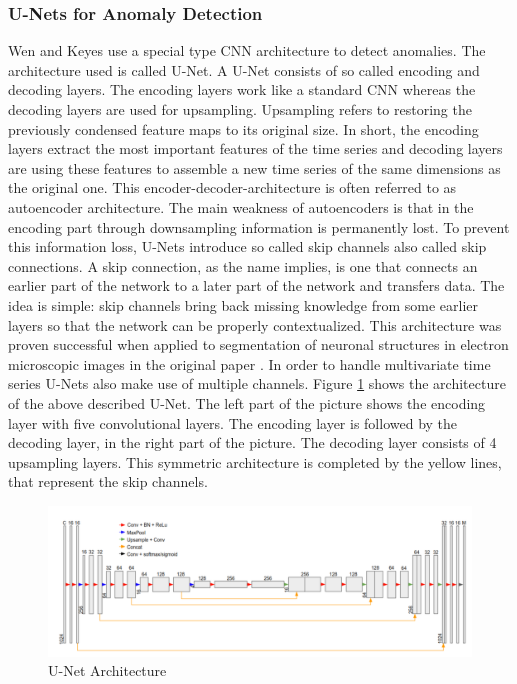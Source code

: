 \subsubsection{U-Nets for Anomaly Detection} \label{U-Net}
Wen and Keyes \parencite*{Wen2019} use a special type CNN architecture to detect anomalies. The architecture used is called U-Net. A U-Net consists of so called encoding and decoding layers. The encoding layers work like a standard CNN whereas the decoding layers are used for upsampling. Upsampling refers to restoring the previously condensed feature maps to its original size. In short, the encoding layers extract the most important features of the time series and decoding layers are using these features to assemble a new time series of the same dimensions as the original one. This encoder-decoder-architecture is often referred to as autoencoder architecture. The main weakness of autoencoders is that in the encoding part through downsampling information is permanently lost. To prevent this information loss, U-Nets introduce so called skip channels also called skip connections. A skip connection, as the name implies, is one that connects an earlier part of the network to a later part of the network and transfers data. The idea is simple: skip channels bring back missing knowledge from some earlier layers so that the network can be properly contextualized. This architecture was proven successful when applied to segmentation of neuronal structures in electron microscopic images in the original paper \parencite{Cicek2016}. In order to handle multivariate time series U-Nets also make use of multiple channels. Figure \ref{fig:U-Net} shows the architecture of the above described U-Net. The left part of the picture shows the encoding layer with five convolutional layers. The encoding layer is followed by the decoding layer, in the right part of the picture. The decoding layer consists of 4 upsampling layers. This symmetric architecture is completed by the yellow lines, that represent the skip channels.

\begin{figure}[h]
	\centering
	\includegraphics[scale=0.32]{Figures/U-Net}
	\decoRule
	\caption[U-Net Architecture]{U-Net Architecture \parencite{Wen2019}}
	\label{fig:U-Net}
\end{figure}

